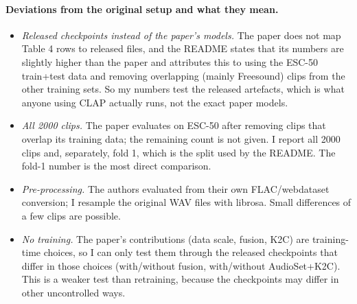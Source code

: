\paragraph{Deviations from the original setup and what they mean.}
\begin{itemize}\itemsep0pt
\item \emph{Released checkpoints instead of the paper's models.} The paper does not map Table 4 rows to released files, and the README states that its numbers are
slightly higher than the paper and attributes this to using the ESC-50 train+test data and removing overlapping (mainly Freesound) clips from the other training sets. So my numbers test the released artefacts, which is what anyone using CLAP actually runs, not the exact paper models.
\item \emph{All 2000 clips.} The paper evaluates on ESC-50 after removing clips that overlap its training data; the remaining count is not given.
I report all 2000 clips and, separately, fold 1, which is the split used by the README. The fold-1 number is the most direct comparison.
\item \emph{Pre-processing.} The authors evaluated from their own FLAC/webdataset conversion; I resample the original WAV files with librosa. Small differences of a few clips are possible.
\item \emph{No training.} The paper's contributions (data scale, fusion, K2C) are training-time choices, so I can only test them through the released checkpoints that differ in those choices (with/without fusion, with/without AudioSet+K2C). This is a weaker test than retraining, because the checkpoints may differ in other uncontrolled ways.
\end{itemize}
